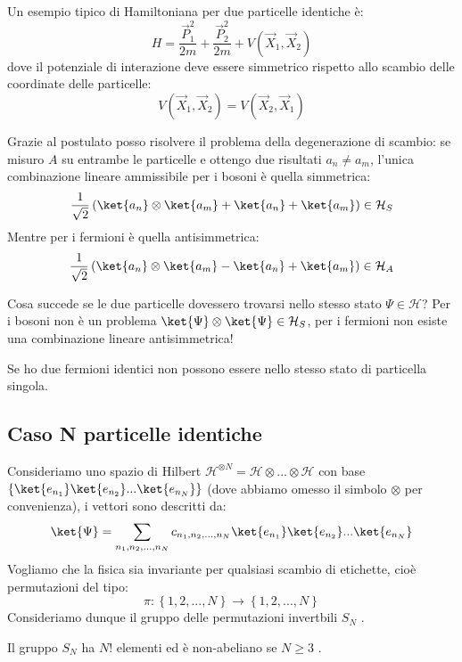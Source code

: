 \begin{example}
    Un esempio tipico di Hamiltoniana per due particelle identiche è:
    \[
    H = \frac{\vec{P}_1^2}{2m} + \frac{\vec{P}_2^2}{2m} + V(\vec{X}_1, \vec{X}_2)
    \]
    dove il potenziale di interazione deve essere simmetrico rispetto allo scambio delle coordinate delle particelle:
    \[
    V(\vec{X}_1, \vec{X}_2) = V(\vec{X}_2, \vec{X}_1)
    \]
\end{example}

Grazie al postulato posso risolvere il problema della degenerazione di scambio: se misuro \(A\) su entrambe le particelle e ottengo due risultati \(a_n \neq a_m\), 
l'unica combinazione lineare ammissibile per i bosoni è quella simmetrica:
\begin{equation}
    \frac{1}{\sqrt{2}}\left( \ket{a_n}\otimes\ket{a_m} + \ket{a_n}+ \ket{a_m} \right)  \in \mathcal{H}_S
\end{equation}
Mentre per i fermioni è quella antisimmetrica:
\begin{equation}
    \frac{1}{\sqrt{2}}\left( \ket{a_n}\otimes\ket{a_m} - \ket{a_n}+ \ket{a_m} \right)  \in \mathcal{H}_A
\end{equation}

\begin{attention}
    Cosa succede se le due particelle dovessero trovarsi nello stesso stato \(\Psi \in \mathcal{H}\)? Per i bosoni non è un problema \(\ket{\Psi}\otimes\ket{\Psi} \in \mathcal{H}_S\),
    per i fermioni non esiste una combinazione lineare antisimmetrica!
\end{attention}

\begin{pauli}
    \label{theo: Pauli}
    Se ho due fermioni identici non possono essere nello stesso stato di particella singola.
\end{pauli}


\subsection{Caso N particelle identiche}
Consideriamo uno spazio di Hilbert \(\mathcal{H}^{\otimes N}= \mathcal{H}\otimes...\otimes \mathcal{H}\) con base \(\left\{ \ket{e_{n_1}}\ket{e_{n_2}}...\ket{e_{n_N}} \right\}\) (dove abbiamo omesso il simbolo \(\otimes\) per convenienza), i vettori sono descritti da:
\begin{equation}
    \ket{\Psi} = \sum_{n_1,n_2,...,n_N}c_{n_1,n_2,..., n_N}\ket{e_{n_1}}\ket{e_{n_2}}...\ket{e_{n_N}}
\end{equation}
Vogliamo che la fisica sia invariante per qualsiasi scambio di etichette, cioè permutazioni del tipo:
\begin{equation}
    \pi : \left\{ 1,2,...,N \right\}\to \left\{ 1,2,..., N \right\}
\end{equation}
Consideriamo dunque il gruppo delle permutazioni invertbili \(S_N\) .
\begin{remark}
    Il gruppo \(S_N\) ha \(N!\) elementi ed è non-abeliano se \(N\geq 3\) .
\end{remark}

